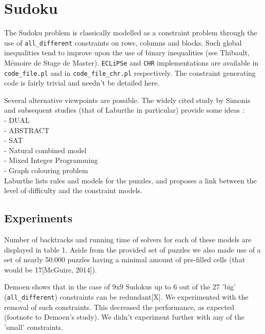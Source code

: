 \section{Sudoku}

The Sudoku problem is classically modelled as a constraint problem through the use of \texttt{all\_different} constraints on rows, columns and blocks. Such global inequalities tend to improve upon the use of binary inequalities (see Thibault, M\'emoire de Stage de Master). \texttt{ECLiPSe} and \texttt{CHR} implementations are available in \texttt{code\_file.pl} and in \texttt{code\_file\_chr.pl} respectively. The constraint generating code is fairly trivial and needn't be detailed here. \\\par

Several alternative viewpoints are possible. The widely cited study by Simonis and subsequent studies (that of Laburthe in particular) provide some ideas :\\
 - DUAL\\
 - ABSTRACT\\
 - SAT\\
 - Natural combined model\\
 - Mixed Integer Programming\\
 - Graph colouring problem\\
Laburthe lists rules and models for the puzzles, and proposes a link between the level of difficulty and the constraint models. \\\par

\subsection{Experiments}

Number of backtracks and running time of solvers for each of these models are displayed in table 1. Aside from the provided set of puzzles we also made use of a set of nearly 50.000 puzzles having a minimal amount of pre-filled cells (that would be 17[McGuire, 2014]). \\\par

Demoen shows that in the case of 9x9 Sudokus up to 6 out of the 27 'big' (\texttt{all\_different}) constraints can be redundant[X]. We experimented with the removal of such constraints. This decreased the performance, as expected (footnote to Demoen's study). We didn't experiment further with any of the 'small' constraints.

